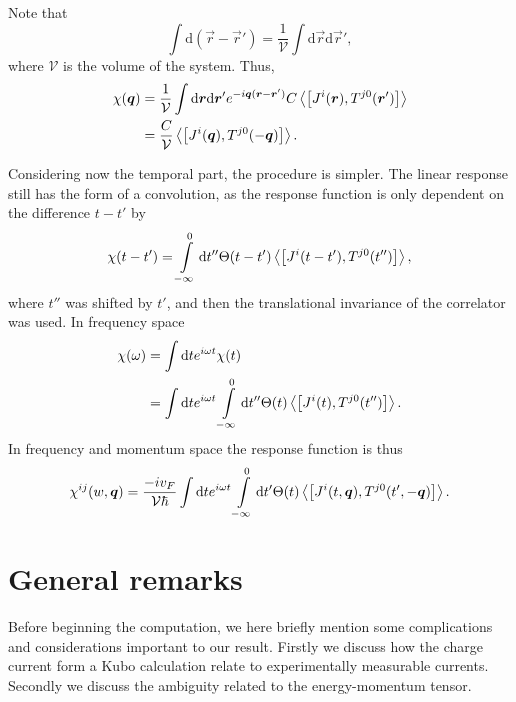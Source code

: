 Note that
\begin{equation}
  \int \mathrm{d}(\vec{r} - \vec{r}') = \frac{1}{\mathcal{V}} \int \mathrm{d}\vec{r} \mathrm{d} \vec{r}',
\end{equation}
where $\mathcal{V}$ is the volume of the system.
Thus,
\begin{equation}
  \begin{split}
    \chi (\vec{q}) &= \frac{1}{\mathcal{V}} \int \mathrm{d}\vec{r} \mathrm{d}\vec{r}'
    e^{-i\vec{q}(\vec{r}-\vec{r}')}
    C \Braket{\left[
        J^i(\vec{r}), T^{j 0}(\vec{r}')
      \right]}\\
    &= \frac{C}{\mathcal{V}} \Braket{\left[ J^i(\vec{q}), T^{j 0}(-\vec{q}) \right]}.
  \end{split}
\end{equation}

Considering now the temporal part, the procedure is simpler.
The linear response still has the form of a convolution, as the response function is only dependent on the difference $t-t'$ by
\begin{equation}
  \chi (t-t') = \int\limits_{-\infty }^0 \mathrm{d} t'' \Theta (t - t')
  \Braket{\left[ J^i(t-t'), T^{j0}(t'') \right]},
\end{equation}
where $t''$ was shifted by $t' $, and then the translational invariance of the correlator was used.
In frequency space
\begin{align}
  \chi (\omega ) &= \int \mathrm{d} t e^{i \omega  t} \chi (t)\\
                 &= \int \mathrm{d} t e^{i \omega  t} \int\limits_{-\infty  }^0 \mathrm{d} t''
                   \Theta (t) \Braket{\left[ J^i(t), T^{j 0}(t'') \right]}.
\end{align}
In frequency and momentum space the response function is thus
\begin{equation}\label{eq:22}
  \chi ^{ij} (w, \vec{q}) =
  \frac{-iv_F}{\mathcal{V} \hbar }
  \int \mathrm{d}t e^{i\omega t}
  \int\limits_{-\infty }^{0} \mathrm{d}t'
  \Theta (t)
  \Braket{\left[
      J^i(t, \vec{q}), T^{j 0}(t', -\vec{q})
    \right]}.
\end{equation}

\section{General remarks}
Before beginning the computation, we here briefly mention some complications and considerations important to our result.
Firstly we discuss how the charge current form a Kubo calculation relate to experimentally measurable currents.
Secondly we discuss the ambiguity related to the energy-momentum tensor.

